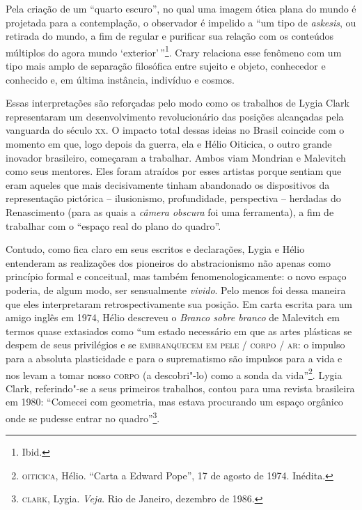\begin{multicols}{2}
Pela
criação de um ``quarto escuro'', no qual uma imagem ótica plana do mundo
é projetada para a contemplação, o observador é impelido a ``um tipo de
\textit{askesis}, ou retirada do mundo, a fim de regular e purificar sua
relação com os conteúdos múltiplos do agora mundo `exterior'\,''\footnote{Ibid.}.
Crary relaciona esse fenômeno com um tipo mais amplo de separação
filosófica entre sujeito e objeto, conhecedor e conhecido e, em última
instância, indivíduo e cosmos. 


Essas interpretações são reforçadas pelo modo como os trabalhos de Lygia
Clark representaram um desenvolvimento revolucionário das posições
alcançadas pela vanguarda do século \textsc{xx}. O impacto total dessas ideias no
Brasil coincide com o momento em que, logo depois da guerra, ela e Hélio
Oiticica, o outro grande inovador brasileiro, começaram a trabalhar.
Ambos viam Mondrian e Malevitch como seus mentores. Eles foram atraídos
por esses artistas porque sentiam que eram aqueles que mais
decisivamente tinham abandonado os dispositivos da representação
pictórica -- ilusionismo, profundidade, perspectiva -- herdadas do
Renascimento (para as quais a \textit{câmera obscura} foi uma ferramenta),
a fim de trabalhar com o ``espaço real do plano do quadro''. 

Contudo,
como fica claro em seus escritos e declarações, Lygia e Hélio entenderam
as realizações dos pioneiros do abstracionismo não apenas como princípio
formal e conceitual, mas também fenomenologicamente: o novo espaço
poderia, de algum modo, ser sensualmente \textit{vivido}. Pelo menos foi
dessa maneira que eles interpretaram retrospectivamente sua posição. Em
carta escrita para um amigo inglês em 1974, Hélio descreveu o
\textit{Branco sobre branco} de Malevitch em termos quase extasiados como
``um estado necessário em que as artes plásticas se despem de seus
privilégios e se \textsc{embranquecem em pele / corpo / ar}: o impulso para a
absoluta plasticidade e para o suprematismo são impulsos para a vida e
nos levam a tomar nosso \textsc{corpo} (a descobri"-lo) como a sonda da
vida''\footnote{\textsc{oiticica}, Hélio. ``Carta a Edward Pope'', 17 de agosto de
  1974. Inédita.}. Lygia Clark, referindo"-se a seus primeiros trabalhos,
contou para uma revista brasileira em 1980: ``Comecei com geometria, mas
estava procurando um espaço orgânico onde se pudesse entrar no
quadro''\footnote{\textsc{clark}, Lygia. \textit{Veja}. Rio de Janeiro, dezembro de
  1986.}.


\end{multicols}
